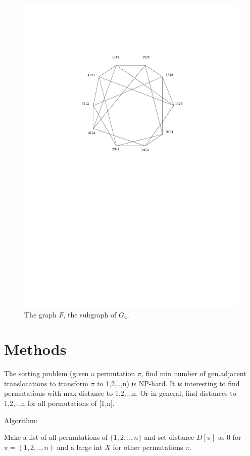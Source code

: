 \documentclass[runningheads]{llncs}
\begin{document}
\begin{figure}[ht]
  \centering
  \includegraphics{f2-modified.pdf}
  \caption{The graph $F$, the subgraph of $G_{4}$.}
  \label{f2}
\end{figure}

\section*{Methods}

The sorting problem (given a permutation $\pi$, find min number of gen.adjacent translocations to transform $\pi$ to 1,2,..,n) is NP-hard. 
It is interesting to find permutations with max distance to 1,2,..,n.
Or in general, find distances to 1,2,..,n for all permutations of [1,n]. 

Algorithm:

Make a list of all permutations of $\{1,2,..,n\}$ and set distance $D[\pi]$ as 0 for $\pi=(1,2,..,n)$ and a large int $X$ for other permutations $\pi$.
\end{document}
